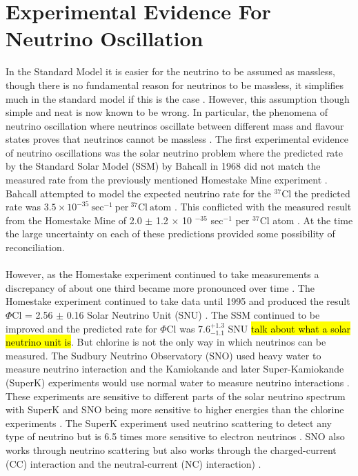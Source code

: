 \section{Experimental Evidence For Neutrino Oscillation}\label{sec:neutrinoFlavours}
In the Standard Model it is easier for the neutrino to be assumed as massless, though there is no fundamental reason for neutrinos to be massless, it simplifies much in the standard model if this is the case \cite{griffiths2008neutrinoOscillations}. However, this assumption though simple and neat is now known to be wrong. In particular, the phenomena of neutrino oscillation where neutrinos oscillate between different mass and flavour states proves that neutrinos cannot be massless \cite{griffiths2008neutrinoOscillations}. The first experimental evidence of neutrino oscillations was the solar neutrino problem where the predicted rate by the Standard Solar Model (SSM) by Bahcall in 1968 did not match the measured rate from the previously mentioned Homestake Mine experiment \cite{griffiths2008neutrinoOscillations}. Bahcall attempted to model the expected neutrino rate for the $^{37}$Cl the predicted rate was $3.5 \times 10 ^{-35} \ \textrm{sec}^{-1} \ \textrm{per} \ ^{37}\textrm{Cl} \ \textrm{atom}$ \cite{bahcall1968present}. This conflicted with the measured result from the Homestake Mine of 2.0 $\pm$ 1.2 $\times$ 10 $^{-35}$ sec$^{-1}$ per $^{37}$Cl atom \cite{davis1968homestake}. At the time the large uncertainty on each of these predictions provided some possibility of reconciliation. 
\\\\However, as the Homestake experiment continued to take measurements a discrepancy of about one third became more pronounced over time \cite{griffiths2008neutrinoOscillations}. The Homestake experiment continued to take data until 1995 and produced the result $\Phi$Cl = 2.56 $\pm$ 0.16 Solar Neutrino Unit (SNU) \cite{Bellerive:2003rj}. The SSM continued to be improved and the predicted rate for $\Phi$Cl was 7.6$^{+ 1.3}_{-1.1}$ SNU \cite{Bellerive:2003rj} \hl{talk about what a solar neutrino unit is}. But chlorine is not the only way in which neutrinos can be measured. The Sudbury Neutrino Observatory (SNO) used heavy water to measure neutrino interaction and the Kamiokande and later Super-Kamiokande (SuperK) experiments would use normal water to measure neutrino interactions \cite{Bellerive:2003rj}. These experiments are sensitive to different parts of the solar neutrino spectrum with SuperK and SNO being more sensitive to higher energies than the chlorine experiments \cite{Bellerive:2003rj}. The SuperK experiment used neutrino scattering to detect any type of neutrino but is 6.5 times more sensitive to electron neutrinos \cite{griffiths2008neutrinoOscillations}. SNO also works through neutrino scattering but also works through the charged-current (CC) interaction and  the neutral-current (NC) interaction) \cite{sno2001}\cite{Bellerive:2003rj} \cite{griffiths2008neutrinoOscillations}. 
